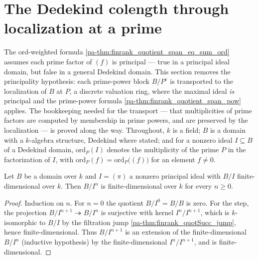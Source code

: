 \section{The Dedekind colength through localization at a prime}
\label{pa-sec:localized_colength}

The ord-weighted formula \ref{pa-thm:finrank_quotient_span_eq_sum_ord} assumes each prime
factor of \((f)\) is principal --- true in a principal ideal domain, but false in a
general Dedekind domain. This section removes the principality hypothesis: each
prime-power block \(B/P^e\) is transported to the localization of \(B\) at \(P\), a
discrete valuation ring, where the maximal ideal \emph{is} principal and the prime-power
formula \ref{pa-thm:finrank_quotient_span_pow} applies. The bookkeeping needed for the
transport --- that multiplicities of prime factors are computed by membership in prime
powers, and are preserved by the localization --- is proved along the way. Throughout,
\(k\) is a field; \(B\) is a domain with a \(k\)-algebra structure, Dedekind where
stated; and for a nonzero ideal \(I \subseteq B\) of a Dedekind domain,
\(\mathrm{ord}_P(I)\) denotes the multiplicity of the prime \(P\) in the factorization of
\(I\), with \(\mathrm{ord}_P(f) = \mathrm{ord}_P\bigl((f)\bigr)\) for an element
\(f \neq 0\).

\begin{theorem}
  \label{pa-thm:moduleFinite_quotient_pow_of_isPrincipal}
  \leanok

  Let \(B\) be a domain over \(k\) and \(I = (\pi)\) a nonzero principal ideal with
  \(B/I\) finite-dimensional over \(k\). Then \(B/I^n\) is finite-dimensional over
  \(k\) for every \(n \ge 0\).
\end{theorem}
\begin{proof}
  \leanok
  Induction on \(n\). For \(n = 0\) the quotient \(B/I^0 = B/B\) is zero. For the step,
  the projection \(B/I^{n+1} \twoheadrightarrow B/I^n\) is surjective with kernel
  \(I^n/I^{n+1}\), which is \(k\)-isomorphic to \(B/I\) by the filtration jump
  \ref{pa-thm:finrank_quotSucc_jump}, hence finite-dimensional. Thus \(B/I^{n+1}\) is an
  extension of the finite-dimensional \(B/I^n\) (inductive hypothesis) by the
  finite-dimensional \(I^n/I^{n+1}\), and is finite-dimensional.
\end{proof}


